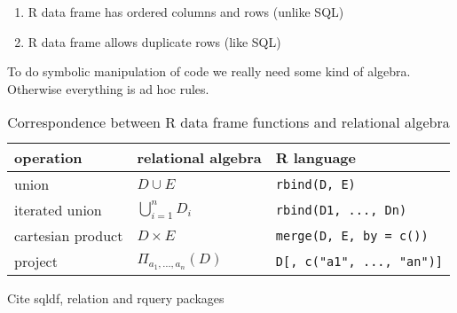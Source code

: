 \documentclass[12pt]{article}
\begin{document}
\begin{enumerate}
    \item R data frame has ordered columns and rows (unlike SQL)
    \item R data frame allows duplicate rows (like SQL)
\end{enumerate}

To do symbolic manipulation of code we really need some kind of algebra.
Otherwise everything is ad hoc rules.



\begin{table}[]
\centering
    \caption{Correspondence between R data frame functions and relational
    algebra}
\label{tab-correspond}
\begin{tabular}{lll}
    \textbf{operation} & \textbf{relational algebra} & \textbf{R language}
    \\
\hline
    union   & $D \cup E$
        & \texttt{rbind(D, E)}
    \\ iterated union  & $\bigcup_{i=1}^n D_i$
        & \texttt{rbind(D1, ..., Dn)}
    \\ cartesian product   & $D \times E$
        & \texttt{merge(D, E, by = c())}
    \\ project & ${\displaystyle \Pi _{a_{1},\ldots ,a_{n}}(D)}$
        & \texttt{D[, c("a1", ..., "an")]}
    \\
\end{tabular}
\end{table}


Cite sqldf, relation and rquery packages
\end{document}
